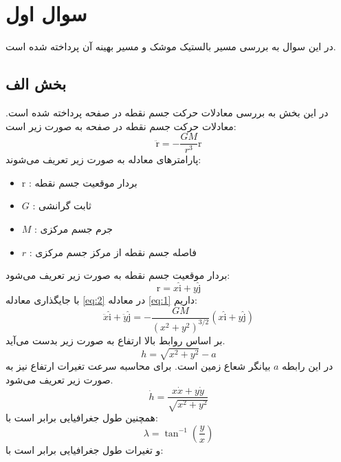 \section{سوال اول}
در این سوال به بررسی مسیر بالستیک موشک و مسیر بهینه آن پرداخته شده است.
\subsection{بخش الف}
در این بخش به بررسی معادلات حرکت جسم نقطه در صفحه پرداخته شده است. معادلات حرکت جسم نقطه در صفحه به صورت زیر است:
\begin{equation}
    \label{eq:1}
    \ddot{\boldsymbol{\mathrm{r}}} = -\dfrac{GM}{r^3}\boldsymbol{\mathrm{r}}
\end{equation}
پارامترهای معادله به صورت زیر تعریف می‌شوند:
\begin{itemize}
    \item $\boldsymbol{\mathrm{r}}$ : بردار موقعیت جسم نقطه
    \item $G$ : ثابت گرانشی
    \item $M$ : جرم جسم مرکزی
    \item $r$ : فاصله جسم نقطه از مرکز جسم مرکزی
\end{itemize}
بردار موقعیت جسم نقطه به صورت زیر تعریف می‌شود:
\begin{equation}
    \label{eq:2}
    \boldsymbol{\mathrm{r}} = x\hat{\boldsymbol{\mathrm{i}}} + y\hat{\boldsymbol{\mathrm{j}}}
\end{equation}
با جایگذاری معادله \eqref{eq:2} در معادله \eqref{eq:1} داریم:
\begin{equation}
    \label{eq:3}
    \ddot{x}\hat{\boldsymbol{\mathrm{i}}} + \ddot{y}\hat{\boldsymbol{\mathrm{j}}} = -\dfrac{GM}{(x^2 + y^2)^{3/2}}(x\hat{\boldsymbol{\mathrm{i}}} + y\hat{\boldsymbol{\mathrm{j}}})
\end{equation}
بر اساس روابط بالا ارتفاع به صورت زیر بدست می‌آید.
\begin{equation}
    \label{eq:4}
    h =\sqrt{x^2 + y^2} - a
\end{equation}
در این رابطه $a$ بیانگر شعاع زمین است. برای محاسبه سرعت 
تغیرات ارتفاع نیز به صورت زیر تعریف می‌شود.
\begin{equation}
    \label{eq:5}
    \dot{h} = \dfrac{x\dot{x} + y\dot{y}}{\sqrt{x^2 + y^2}}
\end{equation}
همچنین طول جغرافیایی برابر است با:
\begin{equation}
    \label{eq:6}
    \lambda = \tan^{-1}\left(\dfrac{y}{x}\right)
\end{equation}
و تغیرات طول جغرافیایی برابر است با:
